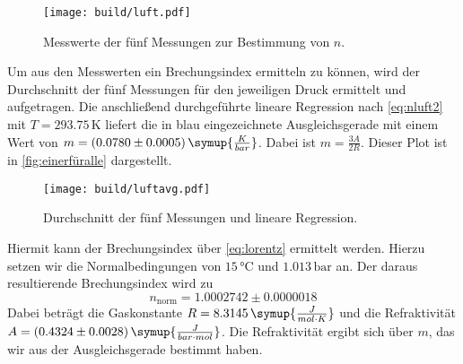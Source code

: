 \begin{figure}
    \centering
    \texttt{[image: build/luft.pdf]}
    \caption{Messwerte der fünf Messungen zur Bestimmung von $n$.}
    \label{fig:allefüreinen}
\end{figure}
Um aus den Messwerten ein Brechungsindex ermitteln zu können, wird der Durchschnitt der fünf Messungen für den jeweiligen Druck ermittelt und aufgetragen. Die anschließend durchgeführte lineare Regression nach \autoref{eq:nluft2} mit $T=293.75\,\unit{\kelvin}$
liefert die in blau eingezeichnete Ausgleichsgerade mit einem Wert von $m=(0.0780\pm 0.0005)\,\symup{\frac{K}{bar}}$. Dabei ist $m= \frac{3A}{2R}$.
Dieser Plot ist in \autoref{fig:einerfüralle} dargestellt.
\begin{figure}
    \centering
    \texttt{[image: build/luftavg.pdf]}
    \caption{Durchschnitt der fünf Messungen und lineare Regression.}
    \label{fig:einerfüralle}
\end{figure}
Hiermit kann der Brechungsindex über \autoref{eq:lorentz} ermittelt werden. Hierzu setzen wir die Normalbedingungen von $15\,\unit{\celsius}$ und $1.013\,\unit{\bar}$ an.
Der daraus resultierende Brechungsindex wird zu
\begin{equation*}
    n_{\text{norm}}= 1.0002742\pm 0.0000018 
\end{equation*}
Dabei beträgt die Gaskonstante $R=8.3145\,\symup{\frac{J}{mol\cdot K}}$ und die Refraktivität $A=(0.4324\pm 0.0028)\,\symup{\frac{J}{bar\cdot mol}}$.
Die Refraktivität ergibt sich über $m$, das wir aus der Ausgleichsgerade bestimmt haben.
